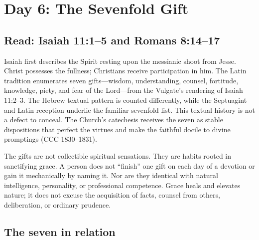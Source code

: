 \section{Day 6: The Sevenfold Gift}


\subsection{Read: Isaiah 11:1--5 and Romans 8:14--17}

Isaiah first describes the Spirit resting upon the messianic shoot from Jesse. Christ possesses the fullness; Christians receive participation in him. The Latin tradition enumerates seven gifts---wisdom, understanding, counsel, fortitude, knowledge, piety, and fear of the Lord---from the Vulgate's rendering of Isaiah 11:2--3. The Hebrew textual pattern is counted differently, while the Septuagint and Latin reception underlie the familiar sevenfold list. This textual history is not a defect to conceal. The Church's catechesis receives the seven as stable dispositions that perfect the virtues and make the faithful docile to divine promptings (CCC 1830--1831).

The gifts are not collectible spiritual sensations. They are habits rooted in sanctifying grace. A person does not “finish” one gift on each day of a devotion or gain it mechanically by naming it. Nor are they identical with natural intelligence, personality, or professional competence. Grace heals and elevates nature; it does not excuse the acquisition of facts, counsel from others, deliberation, or ordinary prudence.

\subsection{The seven in relation}

